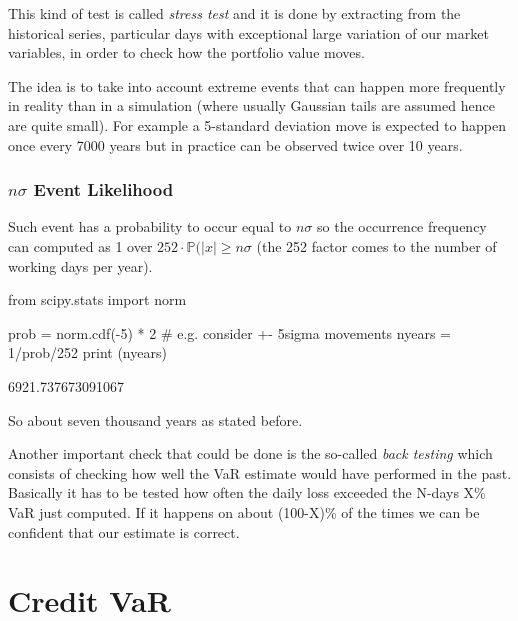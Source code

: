 This kind of test is called \emph{stress test} and it is done by extracting from the historical series, particular days with exceptional large variation of our market variables, in order to check how the portfolio value moves.
 
The idea is to take into account extreme events that can happen more frequently in reality than in a simulation (where usually Gaussian tails are assumed hence are quite small). For example a 5-standard deviation move is expected to happen once every 7000 years but in practice can be observed twice over 10 years.

\begin{attention}
\subsubsection{$n\sigma$ Event Likelihood}
Such event has a probability to occur equal to $n\sigma$ so the occurrence frequency can computed as 1 over $252\cdot\mathbb{P}(|x| \ge n\sigma$ (the 252 factor comes to the number of working days per year).

\begin{attpython}
from scipy.stats import norm

prob = norm.cdf(-5) * 2 # e.g. consider +- 5sigma movements
nyears = 1/prob/252
print (nyears)
\end{attpython}
\begin{ioutput}
6921.737673091067
\end{ioutput}
\noindent
So about seven thousand years as stated before.
\end{attention}

Another important check that could be done is the so-called \emph{back testing} which consists of checking how well the VaR estimate would have performed in the past. Basically it has to be tested how often the daily loss exceeded the N-days X\% VaR just computed. If it happens on about (100-X)\% of the times we can be confident that our estimate is correct.

\section{Credit VaR}
\label{credit-var-cr-var}


